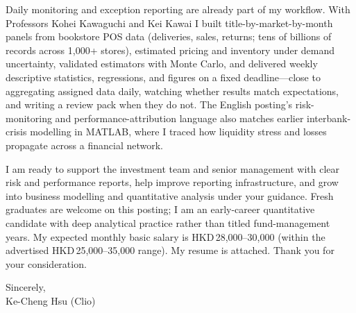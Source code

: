 \documentclass[11pt,letterpaper]{article}
\begin{document}
Daily monitoring and exception reporting are already part of my workflow. With Professors Kohei Kawaguchi and Kei Kawai I built title-by-market-by-month panels from bookstore POS data (deliveries, sales, returns; tens of billions of records across 1{,}000+ stores), estimated pricing and inventory under demand uncertainty, validated estimators with Monte Carlo, and delivered weekly descriptive statistics, regressions, and figures on a fixed deadline---close to aggregating assigned data daily, watching whether results match expectations, and writing a review pack when they do not. The English posting's risk-monitoring and performance-attribution language also matches earlier interbank-crisis modelling in MATLAB, where I traced how liquidity stress and losses propagate across a financial network.

I am ready to support the investment team and senior management with clear risk and performance reports, help improve reporting infrastructure, and grow into business modelling and quantitative analysis under your guidance. Fresh graduates are welcome on this posting; I am an early-career quantitative candidate with deep analytical practice rather than titled fund-management years. My expected monthly basic salary is HKD\,28,000--30,000 (within the advertised HKD\,25,000--35,000 range). My resume is attached. Thank you for your consideration.

\vspace{0.3em}
Sincerely,\\[0.25em]
Ke-Cheng Hsu (Clio)
\end{document}
